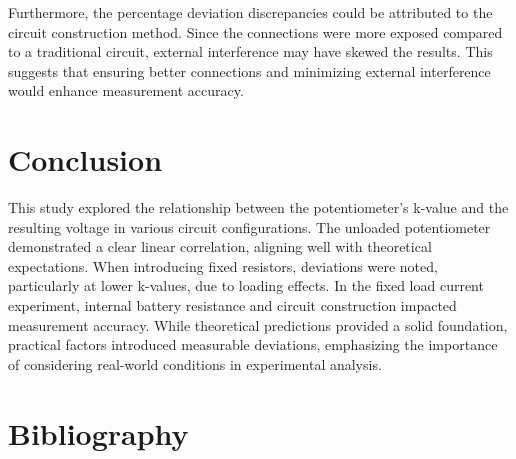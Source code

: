 \documentclass[a4paper]{article}
\begin{document}
Furthermore, the percentage deviation discrepancies could be attributed to the circuit construction method. 
Since the connections were more exposed compared to a traditional circuit, 
external interference may have skewed the results. 
This suggests that ensuring better connections and minimizing external interference would enhance measurement accuracy.


\section{Conclusion}
This study explored the relationship between the potentiometer's k-value and the resulting voltage in various circuit configurations. 
The unloaded potentiometer demonstrated a clear linear correlation, aligning well with theoretical expectations.
When introducing fixed resistors, deviations were noted, particularly at lower k-values, due to loading effects. 
In the fixed load current experiment, internal battery resistance and circuit construction impacted measurement accuracy. 
While theoretical predictions provided a solid foundation, practical factors introduced measurable deviations, 
emphasizing the importance of considering real-world conditions in experimental analysis.
\section{Bibliography}


\end{document}
